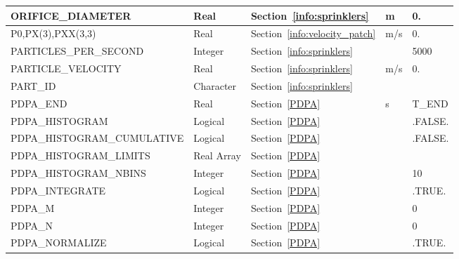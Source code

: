 \documentclass[11pt]{book}
\begin{document}
\begin{longtable}{@{\extracolsep{\fill}}|l|l|l|l|l|}
{\ct ORIFICE\_DIAMETER}                 & Real          & Section~\ref{info:sprinklers}             & m                     & 0.       \\ \hline
{\ct P0,PX(3),PXX(3,3)}                 & Real          & Section~\ref{info:velocity_patch}         & m/s                   &  0.         \\ \hline
{\ct PARTICLES\_PER\_SECOND}            & Integer       & Section~\ref{info:sprinklers}             &                       & 5000      \\ \hline
{\ct PARTICLE\_VELOCITY}                & Real          & Section~\ref{info:sprinklers}             & m/s                   & 0.       \\ \hline
{\ct PART\_ID}                          & Character     & Section~\ref{info:sprinklers}             &                       &           \\ \hline
{\ct PDPA\_END}                         & Real          & Section~\ref{PDPA}                        & s                     & {\ct T\_END} \\ \hline
{\ct PDPA\_HISTOGRAM}                   & Logical       & Section~\ref{PDPA}                        &                       & .FALSE.   \\ \hline
{\ct PDPA\_HISTOGRAM\_CUMULATIVE}       & Logical       & Section~\ref{PDPA}                        &                       & .FALSE.   \\ \hline
{\ct PDPA\_HISTOGRAM\_LIMITS}           & Real Array    & Section~\ref{PDPA}                        &                       &       \\ \hline
{\ct PDPA\_HISTOGRAM\_NBINS}            & Integer       & Section~\ref{PDPA}                        &                       & 10        \\ \hline
{\ct PDPA\_INTEGRATE}                   & Logical       & Section~\ref{PDPA}                        &                       & {\ct .TRUE.}         \\ \hline
{\ct PDPA\_M}                           & Integer       & Section~\ref{PDPA}                        &                       & 0         \\ \hline
{\ct PDPA\_N}                           & Integer       & Section~\ref{PDPA}                        &                       & 0         \\ \hline
{\ct PDPA\_NORMALIZE}                   & Logical       & Section~\ref{PDPA}                        &                       & {\ct .TRUE.}         \\ \hline

\end{longtable}
\end{document}
